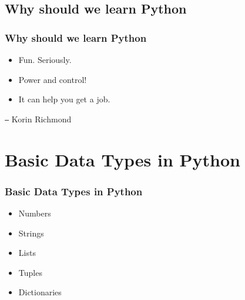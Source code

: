 \documentclass[xcolor={usenames, dvipsnames}, hyperref={colorlinks,linkcolor=black, urlcolor=blue}]{beamer}
\begin{document}
\subsection{Why should we learn Python} 
\begin{frame}
\frametitle{Why should we learn Python}

\begin{itemize}
\item Fun. Seriously.
\item Power and control!
\item It can help you get a job.
\end{itemize}

\begin{flushright}
\texttt{--} Korin Richmond
\end{flushright} 
\end{frame}


\section{Basic Data Types in Python}
\begin{frame}
\frametitle{Basic Data Types in Python}

\begin{itemize}
\item Numbers
\item Strings
\item Lists
\item Tuples
\item Dictionaries
\end{itemize}
\end{frame}

\end{document}
